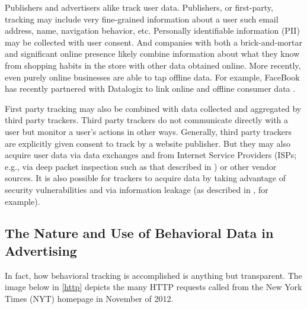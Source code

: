 Publishers and advertisers alike track user data. Publishers, or first-party, tracking may include very fine-grained information about a user such email address, name, navigation behavior, etc. Personally identifiable information (PII) may be collected with user consent. And companies with both a brick-and-mortar and significant online presence likely combine information about what they know from shopping habits in the store with other data obtained online. More recently, even purely online businesses are able to tap offline data. For example, FaceBook has recently partnered with Datalogix to link online and offline consumer data  \citep{Reitman:2012wc}. 

First party tracking may also be combined with data collected and aggregated by third party trackers. Third party trackers do not communicate directly with a user but monitor a user's actions in other ways. Generally, third party trackers are explicitly given consent to track by a website publisher. But they may also acquire user data via data exchanges and from Internet Service Providers (ISPs; e.g., via deep packet inspection such as that described in  \citealp{Sesto:2008va})  or other vendor sources. It is also possible for trackers to acquire data by taking advantage of security vulnerabilities and via information leakage (as described in  \citealp{Krishnamurthy:2009vh},  for example).

\subsection{The Nature and Use of Behavioral Data in Advertising}
\label{thenatureanduseofbehavioraldatainadvertising}

In fact, how behavioral tracking is accomplished is anything but transparent. The image below in  \autoref{http}  depicts the many HTTP requests called from the New York Times (NYT) homepage in November of 2012. 



